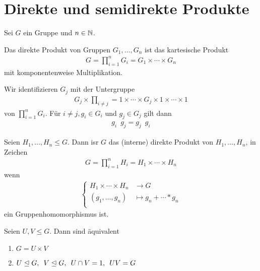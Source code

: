 \section{Direkte und semidirekte Produkte}
%
Sei $G$ ein Gruppe und $n \in \mathbb{N}$.
%
\begin{defin}
	Das direkte Produkt von Gruppen $G_1, \dots , G_n$ ist das kartesische Produkt
	\begin{align*}
		G = \prod \limits_{i=1}^{n}{G_i} = G_1 \times \cdots \times G_n
	\end{align*}
	mit komponentenweise Multiplikation.
\end{defin}
%
\begin{bem}
	Wir identifizieren $G_j$ mit der Untergruppe
	\begin{align*}
		G_j \times \prod_{i \neq j} = 1 \times \cdots \times G_j \times 1 \times \cdots \times 1
	\end{align*}
	von $\prod_{i=1}^{n}{G_i}$. Für $i \neq j, g_i \in G_i$ und $g_j \in G_j$ gilt dann
	\begin{align} \label{eq: kommutierende_g}
		g_i \enspace g_j = g_j \enspace g_i
	\end{align}
\end{bem}
%
\begin{defin}
	Seien $H_1, \dots , H_n \leq G$. Dann isr $G$ das (interne) direkte Produkt von $H_1, \dots , H_n$, in Zeichen
	\begin{align*}
		G = \prod_{i=1}^{n}{H_i} = H_1 \times \cdots \times H_n
	\end{align*}
	wenn
	\begin{align*}
		\begin{cases}
			H_1 \times \cdots \times H_n & \to G \\
			(g_1, \dots , g_n) &\mapsto g_n + \cdots * g_n \\
		\end{cases}
	\end{align*}
	ein Gruppenhomomorphismus ist.
\end{defin}
%
\begin{satz}[!]
	Seien $U,V \leq G$. Dann sind äquivalent
	\begin{enumerate}[label=(\arabic*)]
		\item $G = U \times V$
		\item $U \trianglelefteq G , \enspace V \trianglelefteq G , \enspace U \cap V = 1 , \enspace UV = G$
	\end{enumerate}
\end{satz}
